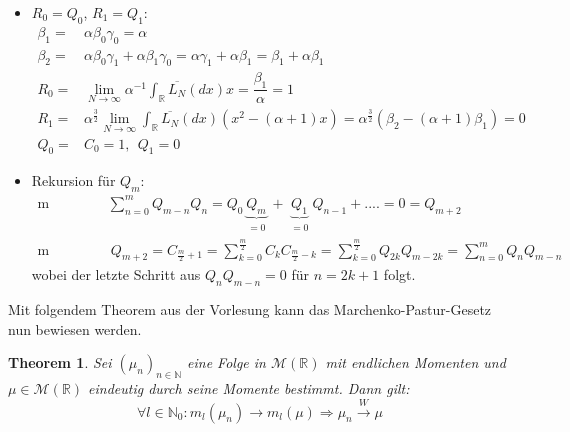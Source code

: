 \documentclass[a4paper, 11pt]{scrreprt}
\newtheorem{theorem}[defi]{Theorem}
\newcommand{\RR}{\mathbb{R}}
\newcommand{\NN}{\mathbb{N}}
\begin{document}
\begin{itemize}
\item $ R_0=Q_0 $, $ R_1=Q_1 $: 
\begin{align*}
\beta_1=& \alpha \beta_0 \gamma_0 = \alpha \\
\beta_2=& \alpha \beta_0 \gamma_1 + \alpha \beta_1 \gamma_0 = \alpha \gamma_1 + \alpha \beta_1 = \beta_1 + \alpha \beta_1  \\
R_0 =& \lim_{N \to \infty} \alpha^{-1} \int_{\RR}\overline{L_{N}}(dx)x = \dfrac{\beta_1}{\alpha}=1 \\
R_1 =& \alpha^{\frac{3}{2}} \lim_{N \to \infty}\int_{\RR}\overline{L_{N}}(dx)(x^2 - (\alpha +1)x)= \alpha^{\frac{3}{2}} (\beta_2 - (\alpha+1)\beta_1)=0 \\
Q_0=& C_0 =1, ~~Q_1=0
\end{align*}

\item Rekursion für $ Q_m: $
\begin{align*}
\text{m ungerade:}& \sum_{n=0}^m Q_{m-n}Q_n= Q_0 \underbrace{Q_m}_{\substack{=0}} + \underbrace{Q_1}_{\substack{=0}}Q_{n-1}+....= 0=Q_{m+2}\\
\text {m gerade:}&~ Q_{m+2}= C_{\frac{m}{2}+1}= \sum_{k=0}^{\frac{m}{2}} C_k C_{\frac{m}{2}-k}=\sum_{k=0}^{\frac{m}{2}} Q_{2k}Q_{m-2k}=\sum_{n=0}^{m}Q_n Q_{m-n}
\end{align*}
wobei der letzte Schritt aus $ Q_n Q_{m-n}=0 $ für $ n=2k+1 $ folgt.\\
\end{itemize}
Mit folgendem Theorem aus der Vorlesung kann das Marchenko-Pastur-Gesetz nun bewiesen werden.

\begin{theorem}
Sei \((\mu_n)_{n \in \NN}\) eine Folge in $\mathcal{M}(\RR)$ mit endlichen Momenten und $\mu \in \mathcal{M}(\RR)$ eindeutig durch seine Momente bestimmt. Dann gilt:
\[\forall l \in \NN_0: m_l(\mu_n) \rightarrow m_l(\mu) \Rightarrow \mu_n \overset{W}{\rightarrow} \mu\]
\end{theorem}
\end{document}
